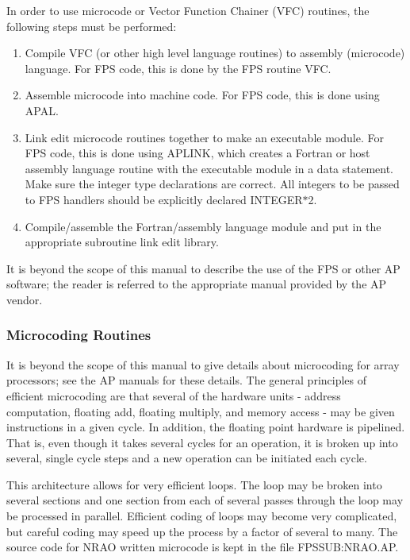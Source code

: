 In order to use microcode or Vector Function Chainer (VFC) routines,
the following steps must be performed:
\begin{enumerate} %
\item Compile VFC (or other high level language routines) to assembly
(microcode) language.  For FPS code, this is done by the FPS routine
VFC.
\item Assemble microcode into machine code.  For FPS code, this is done
using APAL.
\item Link edit microcode routines together to make an executable module.
For FPS code, this is done using APLINK, which creates a Fortran or
host assembly language routine with the executable module in a data
statement.  Make sure the integer type declarations are correct.  All
integers to be passed to FPS handlers should be explicitly declared
INTEGER$\ast$2.
\item Compile/assemble the Fortran/assembly language module and put in the
appropriate subroutine link edit library.
\end{enumerate} %
It is beyond the scope of this manual to describe the use of the FPS
or other AP software; the reader is referred to the appropriate manual
provided by the AP vendor.

\subsubsection{Microcoding Routines }
It is beyond the scope of this manual to give details about
microcoding for array processors; see the AP manuals for these
details.  The general principles of efficient microcoding are that
several of the hardware units - address computation, floating add,
floating multiply, and memory access - may be given instructions in a
given cycle.  In addition, the floating point hardware is pipelined.
That is, even though it takes several cycles for an operation, it is
broken up into several, single cycle steps and a new operation can be
initiated each cycle.

This architecture allows for very efficient loops.  The loop may be
broken into several sections and one section from each of several
passes through the loop may be processed in parallel.  Efficient
coding of loops may become very complicated, but careful coding may
speed up the process by a factor of several to many.  The source code
for NRAO written microcode is kept in the file FPSSUB:NRAO.AP.


